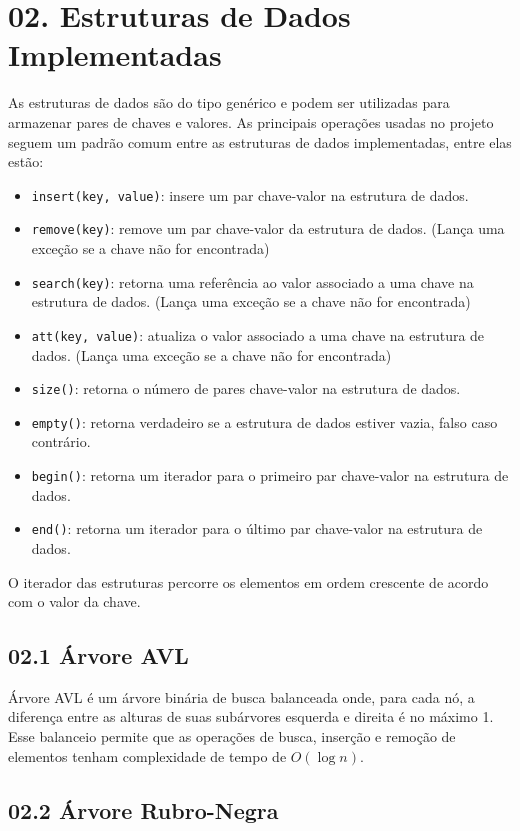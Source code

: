 \documentclass{article}
\begin{document}
\section*{02. Estruturas de Dados Implementadas}
As estruturas de dados são do tipo genérico e podem ser utilizadas para armazenar pares de chaves e valores.
As principais operações usadas no projeto seguem um padrão comum entre as estruturas de dados implementadas, entre elas estão:
\begin{itemize}
    \item \texttt{insert(key, value)}: insere um par chave-valor na estrutura de dados.
    \item \texttt{remove(key)}: remove um par chave-valor da estrutura de dados.  (Lança uma exceção se a chave não for encontrada)
    \item \texttt{search(key)}: retorna uma referência ao valor associado a uma chave na estrutura de dados. (Lança uma exceção se a chave não for encontrada)
    \item \texttt{att(key, value)}: atualiza o valor associado a uma chave na estrutura de dados. (Lança uma exceção se a chave não for encontrada)
    \item \texttt{size()}: retorna o número de pares chave-valor na estrutura de dados.	
    \item \texttt{empty()}: retorna verdadeiro se a estrutura de dados estiver vazia, falso caso contrário.
    \item \texttt{begin()}: retorna um iterador para o primeiro par chave-valor na estrutura de dados.
    \item \texttt{end()}: retorna um iterador para o último par chave-valor na estrutura de dados. \end{itemize}
O iterador das estruturas percorre os elementos em ordem crescente de acordo com o valor da chave.

\subsection*{02.1 Árvore AVL}

Árvore AVL é um árvore binária de busca balanceada onde, para cada nó, a diferença entre as alturas de suas subárvores esquerda e direita é no máximo 1. Esse balanceio permite que as operações de busca, inserção e remoção de elementos tenham complexidade de tempo de \(\displaystyle O(\log n)\).


\subsection*{02.2 Árvore Rubro-Negra}
\end{document}

